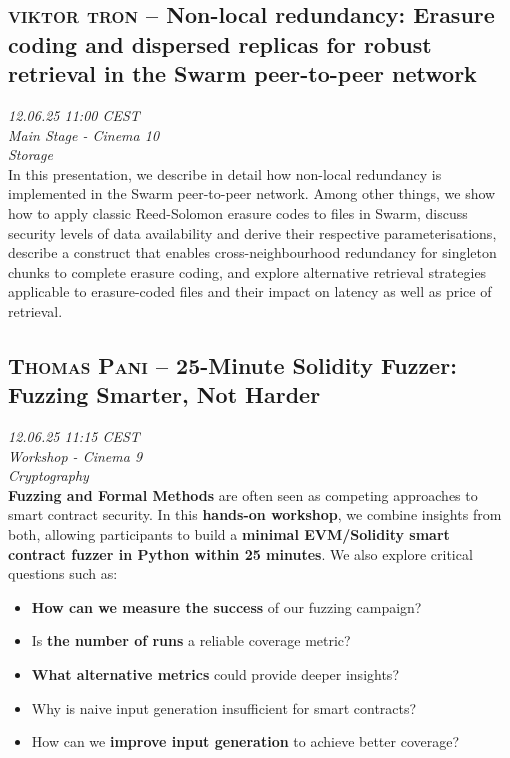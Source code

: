 \clearpage
\subsection {\textsc{viktor tron}  -- Non-local redundancy: Erasure coding and dispersed replicas for robust retrieval in the Swarm peer-to-peer network} \noindent \textit {12.06.25 11:00 CEST\\ Main Stage - Cinema 10\\ Storage}\\[1em] In this presentation, we describe in detail how non-local redundancy is implemented in the Swarm  peer-to-peer network. Among other things, we show how to apply classic Reed-Solomon erasure codes to files in Swarm, discuss security levels of data availability and derive their respective parameterisations, describe a construct that enables cross-neighbourhood redundancy for singleton chunks to complete erasure coding, and explore alternative retrieval strategies applicable to erasure-coded files and their impact on latency as well as price of retrieval.

\clearpage
\subsection {\textsc{Thomas Pani}  -- 25-Minute Solidity Fuzzer: Fuzzing Smarter, Not Harder} \noindent \textit {12.06.25 11:15 CEST\\ Workshop - Cinema 9\\ Cryptography}\\[1em] \textbf{Fuzzing and Formal Methods} are often seen as competing approaches to smart contract security. In this \textbf{hands-on workshop}, we combine insights from both, allowing participants to build a \textbf{minimal EVM/Solidity smart contract fuzzer in Python within 25 minutes}. We also explore critical questions such as:

\begin{itemize}
\item{} \textbf{How can we measure the success} of our fuzzing campaign?
\item{} Is \textbf{the number of runs} a reliable coverage metric?
\item{} \textbf{What alternative metrics} could provide deeper insights?
\item{} Why is naive input generation insufficient for smart contracts?
\item{} How can we \textbf{improve input generation} to achieve better coverage?
\end{itemize}


